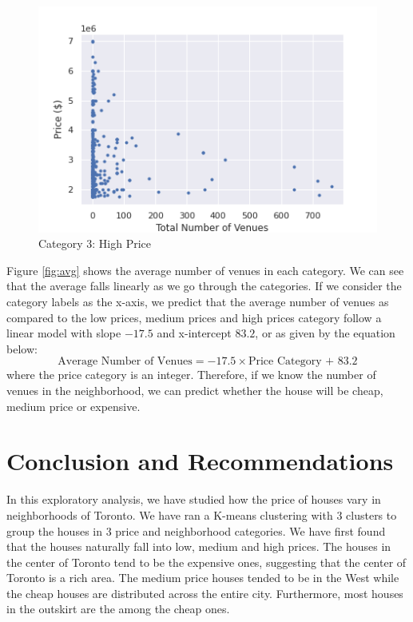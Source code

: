 \documentclass{article}
\begin{document}
\begin{figure}[ht]
\begin{minipage}{0.3\linewidth}
		\includegraphics[width=\textwidth]{hs3.png}
		\caption{Category 3: High Price}
		\label{fig:hs3}
	\end{minipage}
\end{figure}

Figure \ref{fig:avg} shows the average number of venues in each category. We can see that the average falls linearly as we go through the categories. If we consider the category labels as the x-axis, we predict that the average number of venues as compared to the low prices, medium prices and high prices category follow a linear model with slope $-17.5$ and x-intercept $83.2$, or as given by the equation below:
\begin{equation}
	\textrm{Average Number of Venues} = -17.5\times \textrm{Price Category + 83.2}
\end{equation}
where the price category is an integer. Therefore, if we know the number of venues in the neighborhood, we can predict whether the house will be cheap, medium price or expensive.\\

\section{Conclusion and Recommendations}

In this exploratory analysis, we have studied how the price of houses vary in neighborhoods of Toronto. We have ran a K-means clustering with 3 clusters to group the houses in 3 price and neighborhood categories.  We have first found that the houses naturally fall into low, medium and high prices. The houses in the center of Toronto tend to be the expensive ones, suggesting that the center of Toronto is a rich area. The medium price houses tended to be in the West while the cheap houses are distributed across the entire city. Furthermore, most houses in the outskirt are the among the cheap ones. \\
\end{document}
